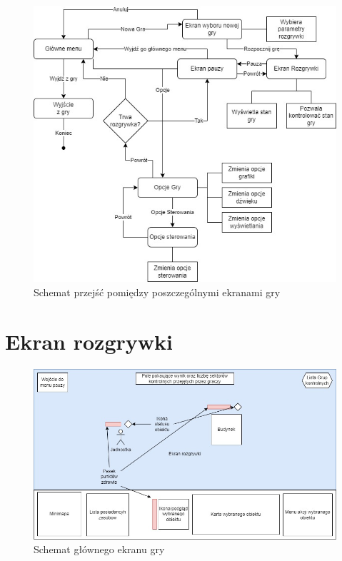 \documentclass[a4paper]{scrreprt}
\begin{document}
\begin{figure}[hb]
  \centering
  \includegraphics[width=1\textwidth]{screenDiagram.jpg}
  \caption{\label{fig:schema1} Schemat przejść pomiędzy poszczególnymi ekranami gry}
\end{figure}
\newpage

\section{Ekran rozgrywki}
\begin{figure}[hb]
  \centering
  \includegraphics[width=1\textwidth]{mainScreenExample.jpg}
  \caption{\label{fig:schema2} Schemat głównego ekranu gry}
\end{figure}
\end{document}
